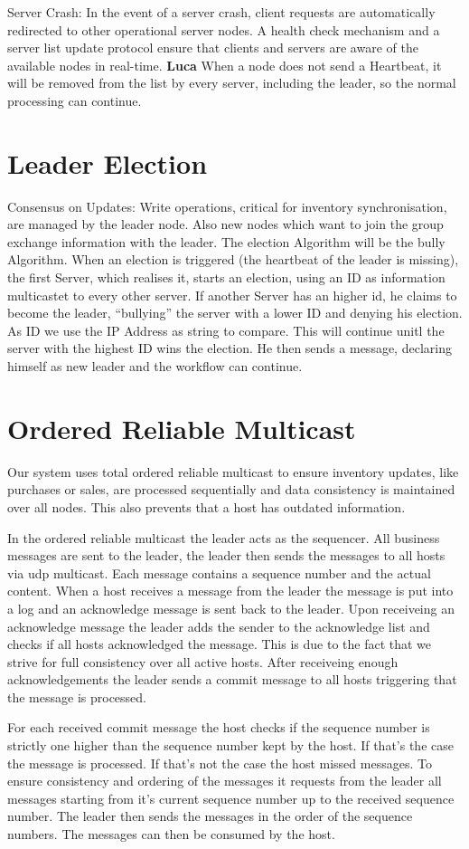 Server Crash: In the event of a server crash, client requests are automatically redirected to other operational server nodes. A health check mechanism and a server list update protocol ensure that clients and servers are aware of the available nodes in real-time. \textbf{Luca} When a node does not send a Heartbeat,
it will be removed from the list by every server, including the leader, so the normal processing can continue.


\section{Leader Election}\label{sec:Election}
Consensus on Updates: Write operations, critical for inventory synchronisation, are managed by the leader node. Also new nodes which want to join the group exchange information with the leader. The election Algorithm will be the bully Algorithm.
When an election is triggered (the heartbeat of the leader is missing), the first Server, which realises it, starts an election, using an ID as information multicastet to every other server. If another Server has an higher id, he claims to become the leader,
\enquote{bullying} the server with a lower ID and denying his election. As ID we use the IP Address as string to compare. This will continue unitl the server with the highest ID wins the election. He then sends a message, declaring himself as new leader and the workflow can continue.

\section{Ordered Reliable Multicast}\label{sec:OrderedReliableMulticast}
Our system uses total ordered reliable multicast to ensure inventory updates, like purchases or sales, are processed sequentially and data consistency is maintained over all nodes. This also prevents that a host has outdated information. 

In the ordered reliable multicast the leader acts as the sequencer. All business messages are sent to the leader, the leader then sends the messages to all hosts via udp multicast. Each message contains a sequence number and the actual content. When a host receives a message from the leader the message is put into a log and an acknowledge message is sent back to the leader. Upon receiveing an acknowledge message the leader adds the sender to the acknowledge list and checks if all hosts acknowledged the message. This is due to the fact that we strive for full consistency over all active hosts. After receiveing enough acknowledgements the leader sends a commit message to all hosts triggering that the message is processed. 

For each received commit message the host checks if the sequence number is strictly one higher than the sequence number kept by the host. 
If that's the case the message is processed.
If that's not the case the host missed messages. To ensure consistency and ordering of the messages it requests from the leader all messages starting from it's current sequence number up to the received sequence number. The leader then sends the messages in the order of the sequence numbers. The messages can then be consumed by the host. 
